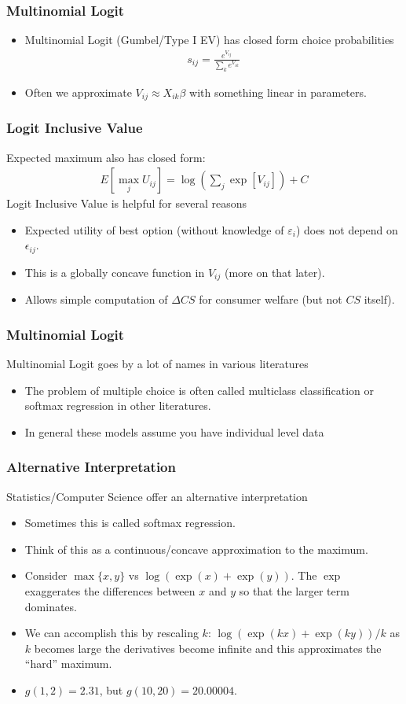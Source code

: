 \documentclass[xcolor=pdftex,dvipsnames,table,mathserif,aspectratio=169]{beamer}
\begin{document}
\begin{frame}
\frametitle{Multinomial Logit}
\begin{itemize}
\item Multinomial Logit (Gumbel/Type I EV) has closed form choice probabilities
\begin{eqnarray*}
s_{ij} = \frac{e^{V_{ij}}}{\sum_k e^{V_{ik}}}
\end{eqnarray*}
\item Often we approximate $V_{ij} \approx  X_{ik} \beta$ with something linear in parameters.
\end{itemize}
\end{frame}


\begin{frame}
\frametitle{Logit Inclusive Value}
 Expected maximum also has closed form:
\begin{eqnarray*}
E[\max_j U_{ij}] = \log \left(\sum_j \exp[V_{ij}] \right) + C
\end{eqnarray*}
Logit Inclusive Value is helpful for several reasons
\begin{itemize}
\item Expected utility of best option (without knowledge of $\varepsilon_i$) does not depend on $\epsilon_{ij}$.
\item This is a globally concave function in $V_{ij}$ (more on that later).
\item Allows simple computation of $\Delta CS$ for consumer welfare (but not $CS$ itself).
\end{itemize}
\end{frame}

\begin{frame}
\frametitle{Multinomial Logit}
Multinomial Logit goes by a lot of names in various literatures
\begin{itemize}
\item The problem of multiple choice is often called \alert{multiclass classification} or \alert{softmax regression} in other literatures.
\item In general these models assume you have individual level data
\end{itemize}
\end{frame}

\begin{frame}
\frametitle{Alternative Interpretation}
Statistics/Computer Science offer an alternative interpretation
\begin{itemize}
\item Sometimes this is called \alert{softmax} regression.
\item Think of this as a continuous/concave approximation to the maximum.
\item Consider $\max\{x,y\}$ vs $\log(\exp(x) + \exp(y))$. The $\exp$ exaggerates the differences between $x$ and $y$ so that the larger term dominates.
\item We can accomplish this by rescaling $k$:  $\log(\exp(kx) + \exp(ky))/k$ as $k$ becomes large the derivatives become infinite and this approximates the ``hard'' maximum.
\item $g(1, 2) = 2.31$, but $g(10, 20) = 20.00004$.
\end{itemize}
\end{frame}
\end{document}
